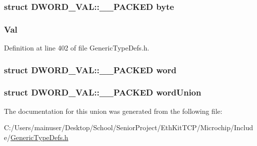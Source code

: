 \subsubsection[{byte}]{\setlength{\rightskip}{0pt plus 5cm}struct {\bf D\+W\+O\+R\+D\+\_\+\+V\+A\+L\+::\+\_\+\+\_\+\+P\+A\+C\+K\+E\+D}  byte}\label{union_d_w_o_r_d___v_a_l_a4790ca552a89e97441bece3078aa8785}
\hypertarget{union_d_w_o_r_d___v_a_l_a1a2aefd22f32fe19c7a40fd62958b591}{}
\subsubsection[{Val}]{ Val}\label{union_d_w_o_r_d___v_a_l_a1a2aefd22f32fe19c7a40fd62958b591}


Definition at line 402 of file Generic\+Type\+Defs.\+h.

\hypertarget{union_d_w_o_r_d___v_a_l_afaba180484520f5e83d699aeb6a67551}{}
\subsubsection[{word}]{\setlength{\rightskip}{0pt plus 5cm}struct {\bf D\+W\+O\+R\+D\+\_\+\+V\+A\+L\+::\+\_\+\+\_\+\+P\+A\+C\+K\+E\+D}  word}\label{union_d_w_o_r_d___v_a_l_afaba180484520f5e83d699aeb6a67551}
\hypertarget{union_d_w_o_r_d___v_a_l_a61a9a0a4f8e98991e87e8b16aad916e5}{}
\subsubsection[{word\+Union}]{\setlength{\rightskip}{0pt plus 5cm}struct {\bf D\+W\+O\+R\+D\+\_\+\+V\+A\+L\+::\+\_\+\+\_\+\+P\+A\+C\+K\+E\+D} word\+Union}\label{union_d_w_o_r_d___v_a_l_a61a9a0a4f8e98991e87e8b16aad916e5}


The documentation for this union was generated from the following file\+:\begin{DoxyCompactItemize}
\item 
C\+:/\+Users/mainuser/\+Desktop/\+School/\+Senior\+Project/\+Eth\+Kit\+T\+C\+P/\+Microchip/\+Include/\hyperlink{_generic_type_defs_8h}{Generic\+Type\+Defs.\+h}\end{DoxyCompactItemize}
